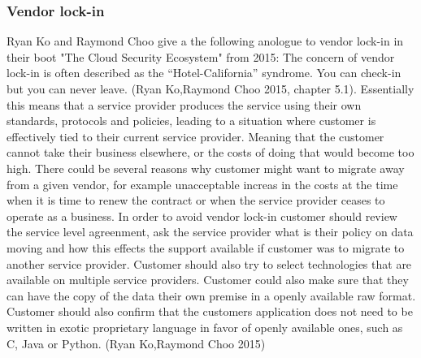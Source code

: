 \documentclass{article}
\begin{document}
\subsubsection{Vendor lock-in}
Ryan Ko and Raymond Choo give a the following anologue to vendor lock-in in their boot "The Cloud Security Ecosystem" from 2015: The concern of vendor lock-in is often described as the “Hotel-California” syndrome. You can check-in but you can never leave. (Ryan Ko,Raymond Choo 2015, chapter 5.1).
Essentially this means that a service provider produces the service using their own standards, protocols and policies, leading to a situation where customer is effectively tied to their current service provider. Meaning that the customer cannot take their business elsewhere, or the costs of doing that would become too high. There could be several reasons why customer might want to migrate away from a given vendor, for example unacceptable increas in the costs at the time when it is time to renew the contract or when the service provider ceases to operate as a business. In order to avoid vendor lock-in customer should review the service level agreenment, ask the service provider what is their policy on data moving and how this effects the support available if customer was to migrate to another service provider. Customer should also try to select technologies that are available on multiple service providers. Customer could also make sure that they can have the copy of the data their own premise in a openly available raw format. Customer should also confirm that the customers application does not need to be written in exotic proprietary language in favor of openly available ones, such as C, Java or Python. (Ryan Ko,Raymond Choo 2015)
\end{document}
